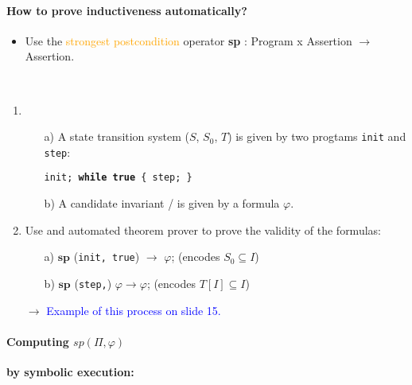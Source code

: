 \paragraph{How to prove inductiveness automatically?} 
\begin{itemize}
    \item Use the \textcolor{orange}{strongest postcondition} operator \textbf{sp} : Program x Assertion $\rightarrow$ Assertion.
\end{itemize}{}

\begin{minipage}{0.9\linewidth}
    \centering      
    \def\svgwidth{\linewidth}
        
\end{minipage}
\\

\begin{enumerate}
    \item 
    \begin{itemize}
        \item [a)] A state transition system ($S$, $S_0$, $T$) is given by two progtams \texttt{init} and \texttt{step}:
        \item[] \texttt{init; \textbf{while true} \{ step; \}}
        \item [b)] A candidate invariant / is given by a formula $\varphi$.
    \end{itemize}
    \item Use and automated theorem prover to prove the validity of the formulas:
    \begin{itemize}
        \item[a)] $\textbf{sp}$ (\texttt{init, true}) $\rightarrow$ $\varphi$; (encodes $S_0 \subseteq I$)
        \item[b)] $\textbf{sp}$ (\texttt{step,}) $\varphi \rightarrow \varphi$; (encodes $T[I] \subseteq I$)
    \end{itemize}{}
    \item[$\rightarrow$] \textcolor{blue}{Example of this process on slide 15.}
\end{enumerate}

\paragraph{Computing  $sp(\Pi,\varphi)$}\textbf{by symbolic execution:}

\begin{minipage}{0.9\linewidth}
    \centering      
    \def\svgwidth{\linewidth}
        
\end{minipage}

